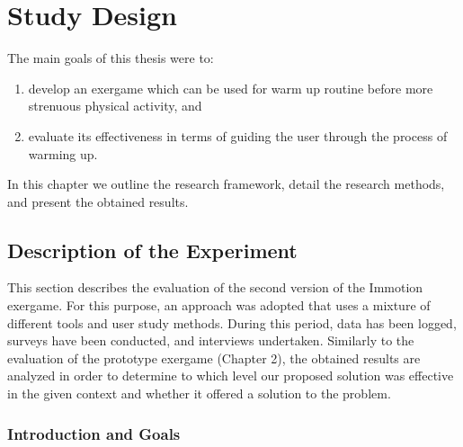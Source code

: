 \chapter{Study Design}\label{chapter:studydesign}
The main goals of this thesis were to:
\begin{enumerate}
\item develop an exergame which can be used for warm up routine before more strenuous physical activity, and
\item evaluate its effectiveness in terms of guiding the user through the process of warming up.
\end{enumerate} In this chapter we outline the research framework, detail the research methods, and present the obtained results.
\section{Description of the Experiment}
This section describes the evaluation of the second version of the Immotion exergame. For this purpose, an approach was adopted that uses a mixture of different tools and user study methods. During this period, data has been logged, surveys have been conducted, and interviews undertaken. Similarly to the evaluation of the prototype exergame (Chapter 2), the obtained results are analyzed in order to determine to which level our proposed solution was effective in the given context and whether it offered a solution to the problem. %

\subsection{Introduction and Goals} \label{chapter:goals}

